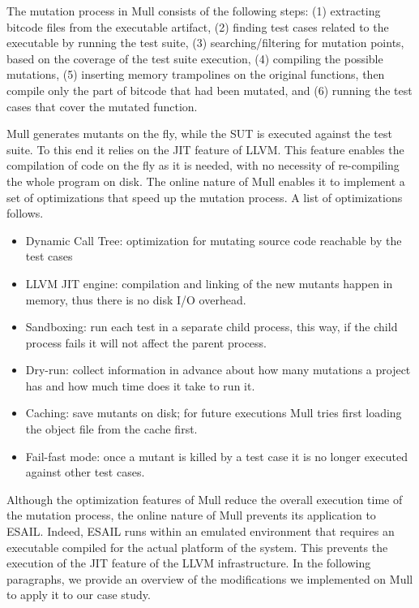 The mutation process in Mull consists of the following steps: (1) extracting bitcode files from the executable artifact, (2) finding test cases related to the executable by running the test suite, (3) searching/filtering for mutation points, based on the coverage of the test suite execution, (4) compiling the possible mutations, (5) inserting memory trampolines on the original functions, then compile only the part of bitcode that had been mutated, and (6) running the test cases that cover the mutated function.

Mull generates mutants on the fly, while the SUT is executed against the test suite. To this end it relies on the JIT feature of LLVM. This feature enables the compilation of code on the fly as it is needed, with no necessity of re-compiling the whole program on disk. The online nature of Mull enables it to implement a set of optimizations that speed up the mutation process. A list of optimizations follows.

\begin{itemize}
	\item Dynamic Call Tree: optimization for mutating source code reachable by the test cases
	\item LLVM JIT engine: compilation and linking of the new mutants happen in memory, thus there is no disk I/O overhead.
	\item Sandboxing: run each test in a separate child process, this way, if the child process fails it will not affect the parent process.
	\item Dry-run: collect information in advance about how many mutations a project has and how much time does it take to run it.
	\item Caching: save mutants on disk; for future executions Mull tries first loading the object file from the cache first.
	\item Fail-fast mode: once a mutant is killed by a test case it is no longer executed against other test cases.
\end{itemize}

Although the optimization features of Mull reduce the overall execution time of the mutation process, the online nature of Mull prevents its application to ESAIL. Indeed, ESAIL runs within an emulated environment that requires an executable compiled for the actual platform of the system. This prevents the execution of the JIT feature of the LLVM infrastructure. In the following paragraphs, we provide an overview of the modifications we implemented on Mull to apply it to our case study.

